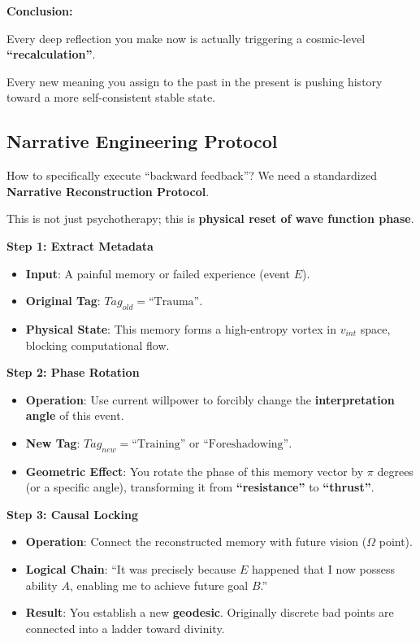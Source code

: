 \textbf{Conclusion:}

Every deep reflection you make now is actually triggering a cosmic-level \textbf{``recalculation''}.

Every new meaning you assign to the past in the present is pushing history toward a more self-consistent stable state.

\subsection{Narrative Engineering Protocol}

How to specifically execute ``backward feedback''? We need a standardized \textbf{Narrative Reconstruction Protocol}.

This is not just psychotherapy; this is \textbf{physical reset of wave function phase}.

\textbf{Step 1: Extract Metadata}

\begin{itemize}
\item \textbf{Input}: A painful memory or failed experience (event $E$).

\item \textbf{Original Tag}: $Tag_{old} = \text{``Trauma''}$.

\item \textbf{Physical State}: This memory forms a high-entropy vortex in $v_{int}$ space, blocking computational flow.
\end{itemize}

\textbf{Step 2: Phase Rotation}

\begin{itemize}
\item \textbf{Operation}: Use current willpower to forcibly change the \textbf{interpretation angle} of this event.

\item \textbf{New Tag}: $Tag_{new} = \text{``Training''}$ or $\text{``Foreshadowing''}$.

\item \textbf{Geometric Effect}: You rotate the phase of this memory vector by $\pi$ degrees (or a specific angle), transforming it from \textbf{``resistance''} to \textbf{``thrust''}.
\end{itemize}

\textbf{Step 3: Causal Locking}

\begin{itemize}
\item \textbf{Operation}: Connect the reconstructed memory with future vision ($\Omega$ point).

\item \textbf{Logical Chain}: ``It was precisely because $E$ happened that I now possess ability $A$, enabling me to achieve future goal $B$.''

\item \textbf{Result}: You establish a new \textbf{geodesic}. Originally discrete bad points are connected into a ladder toward divinity.
\end{itemize}

